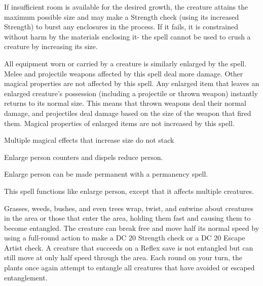 \begin{multicols}{2}
\begin{small}
\smallskip\noindent If insufficient room is available for the desired growth, the creature attains the maximum possible size and may make a Strength check (using its increased Strength) to burst any enclosures in the process. If it fails, it is constrained without harm by the materials enclosing it- the spell cannot be used to crush a creature by increasing its size.

\smallskip\noindent All equipment worn or carried by a creature is similarly enlarged by the spell. Melee and projectile weapons affected by this spell deal more damage. Other magical properties are not affected by this spell. Any enlarged item that leaves an enlarged creature's possession (including a projectile or thrown weapon) instantly returns to its normal size. This means that thrown weapons deal their normal damage, and projectiles deal damage based on the size of the weapon that fired them. Magical properties of enlarged items are not increased by this spell.

\smallskip\noindent Multiple magical effects that increase size do not stack

\smallskip\noindent Enlarge person counters and dispels reduce person.

\smallskip\noindent Enlarge person can be made permanent with a permanency spell.


\noindent This spell functions like enlarge person, except that it affects multiple creatures.

\noindent Grasses, weeds, bushes, and even trees wrap, twist, and entwine about creatures in the area or those that enter the area, holding them fast and causing them to become entangled. The creature can break free and move half its normal speed by using a full-round action to make a DC 20 Strength check or a DC 20 Escape Artist check. A creature that succeeds on a Reflex save is not entangled but can still move at only half speed through the area. Each round on your turn, the plants once again attempt to entangle all creatures that have avoided or escaped entanglement.


\end{small}
\end{multicols}
